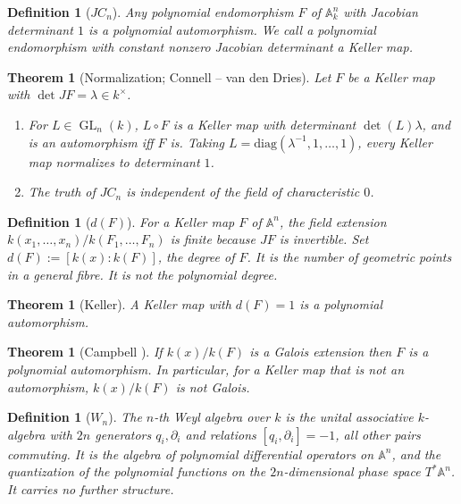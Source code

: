 \documentclass[11pt]{article}
\theoremstyle{change}
\newtheorem{definition}[equation]{Definition}
\newtheorem{theorem}[equation]{Theorem}
\theoremstyle{nonumberplain}
\renewcommand\AA{{\mathbb A}}
\DeclareMathOperator{\GL}{GL}
\begin{document}
\begin{definition}[$JC_n$]
Any polynomial endomorphism $F$ of $\AA^n_k$ with Jacobian determinant $1$ is a polynomial automorphism. We call a polynomial endomorphism with constant nonzero Jacobian determinant a \emph{Keller map}.
\end{definition}

\begin{theorem}[Normalization; Connell -- van den Dries\label{vC}]
Let $F$ be a Keller map with $\det JF = \lambda \in k^\times$.
\begin{enumerate}
\item For $L \in \GL_n(k)$, $L \circ F$ is a Keller map with determinant $\det(L)\lambda$, and is an automorphism iff $F$ is. Taking $L = \mathrm{diag}(\lambda^{-1}, 1, \dots, 1)$, every Keller map normalizes to determinant $1$.
\item \cite{CvdD} The truth of $JC_n$ is independent of the field of characteristic $0$.
\end{enumerate}
\end{theorem}

\begin{definition}[$d(F)$]
For a Keller map $F$ of $\AA^n$, the field extension $k(x_1, \dots, x_n) / k(F_1, \dots, F_n)$ is finite because $JF$ is invertible. Set $d(F) := [k(x) : k(F)]$, the \emph{degree} of $F$. It is the number of geometric points in a general fibre. It is not the polynomial degree.
\end{definition}

\begin{theorem}[Keller\label{keller}]
A Keller map with $d(F) = 1$ is a polynomial automorphism.
\end{theorem}

\begin{theorem}[Campbell \cite{Campbell}\label{campbell}]
If $k(x)/k(F)$ is a Galois extension then $F$ is a polynomial automorphism. In particular, for a Keller map that is not an automorphism, $k(x)/k(F)$ is not Galois.
\end{theorem}

\begin{definition}[$W_n$]
The $n$-th Weyl algebra over $k$ is the unital associative $k$-algebra with $2n$ generators $q_i, \partial_i$ and relations $[q_i, \partial_i] = -1$, all other pairs commuting. It is the algebra of polynomial differential operators on $\AA^n$, and the quantization of the polynomial functions on the $2n$-dimensional phase space $T^*\AA^n$. It carries no further structure.
\end{definition}
\end{document}
